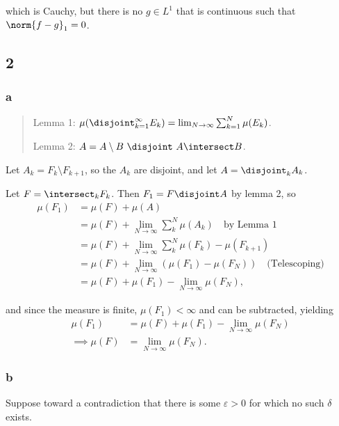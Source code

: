 which is Cauchy, but there is no \(g\in L^1\) that is continuous such
that \(\norm{f - g}_1 = 0\).

\hypertarget{section-1}{%
\subsection{2}\label{section-1}}

\hypertarget{a-1}{%
\subsubsection{a}\label{a-1}}

\begin{quote}
Lemma 1:
\(\mu(\disjoint_{k=1}^\infty E_k) = \lim_{N\to\infty} \sum_{k=1}^N \mu(E_k)\).

Lemma 2: \(A = A\setminus B ~\disjoint~ A\intersect B\).
\end{quote}

Let \(A_k = F_k \setminus F_{k+1}\), so the \(A_k\) are disjoint, and
let \(A = \disjoint_k A_k\).

Let \(F = \intersect_k F_k\). Then \(F_1 = F \disjoint A\) by lemma 2,
so \begin{align*}
\mu(F_1) 
&= \mu(F) + \mu(A) \\
&= \mu(F) + \lim_{N\to\infty} \sum_k^N \mu(A_k) \quad \text{by Lemma 1}\\
&= \mu(F) + \lim_{N\to\infty} \sum_k^N \mu(F_k) - \mu(F_{k+1}) \\
&= \mu(F) + \lim_{N\to\infty} \left( \mu(F_1) - \mu(F_N) \right) \quad\text{(Telescoping)} \\
&=\mu(F) + \mu(F_1) - \lim_{N\to\infty} \mu(F_N)
,\end{align*}

and since the measure is finite, \(\mu(F_1) < \infty\) and can be
subtracted, yielding \begin{align*}
\mu(F_1) &= \mu(F) + \mu(F_1) - \lim_{N\to\infty} \mu(F_N) \\
\implies \mu(F) &= \lim_{N\to\infty} \mu(F_N)
.\end{align*}

\hypertarget{b-1}{%
\subsubsection{b}\label{b-1}}

Suppose toward a contradiction that there is some \(\varepsilon > 0\)
for which no such \(\delta\) exists.

